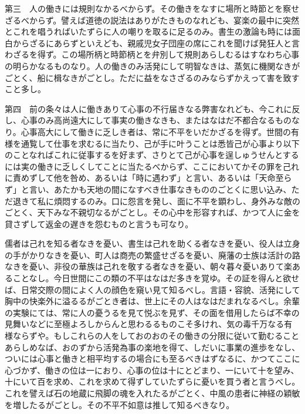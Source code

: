 \documentclass[a4paper, platex, dvipdfmx]{jsarticle}
\begin{document}
第三　人の働きには規則なかるべからず。その働きをなすに場所と時節とを察せざるべからず。譬えば道徳の説法はありがたきものなれども、宴楽の最中に突然とこれを唱うればいたずらに人の嘲りを取るに足るのみ。書生の激論も時には面白からざるにあらずといえども、親戚児女子団座の席にこれを聞けば発狂人と言わざるを得ず。この場所柄と時節柄とを弁別して規則あらしむるはすなわち心事の明らかなるものなり。人の働きのみ活発にして明智なきは、蒸気に機関なきがごとく、船に楫なきがごとし。ただに益をなさざるのみならずかえって害を致すこと多し。

第四　前の条々は人に働きありて心事の不行届きなる弊害なれども、今これに反し、心事のみ高尚遠大にして事実の働きなきも、またはなはだ不都合なるものなり。心事高大にして働きに乏しき者は、常に不平をいだかざるを得ず。世間の有様を通覧して仕事を求むるに当たり、己が手に叶うことは悉皆己が心事より以下のことなればこれに従事するを好まず、さりとて己が心事を逞しゅうせんとするには実の働きに乏しくしてことに当たるべからず、ここにおいてかその罪を己れに責めずして他を咎め、あるいは「時に遇わず」と言い、あるいは「天命至らず」と言い、あたかも天地の間になすべき仕事なきもののごとくに思い込み、ただ退きて私に煩悶するのみ。口に怨言を発し、面に不平を顕わし、身外みな敵のごとく、天下みな不親切なるがごとし。その心中を形容すれば、かつて人に金を貸さずして返金の遅きを怨むものと言うも可なり。

儒者は己れを知る者なきを憂い、書生は己れを助くる者なきを憂い、役人は立身の手がかりなきを憂い、町人は商売の繁盛せざるを憂い、廃藩の士族は活計の路なきを憂い、非役の華族は己れを敬する者なきを憂い、朝々暮々憂いありて楽あることなし。今日世間にこの類の不平はなはだ多きを覚ゆ。その証を得んと欲せば、日常交際の間によく人の顔色を窺い見て知るべし。言語・容貌、活発にして胸中の快楽外に溢るるがごとき者は、世上にその人はなはだまれなるべし。余輩の実験にては、常に人の憂うるを見て悦ぶを見ず、その面を借用したらば不幸の見舞いなどに至極よろしからんと思わるるものこそ多けれ、気の毒千万なる有様ならずや。もしこれらの人をしておのおのその働きの分限に従いて勤むることあらしめなば、おのずから活発為事の楽地を得て、しだいに事業の進歩をなし、ついには心事と働きと相平均するの場合にも至るべきはずなるに、かつてここに心づかず、働きの位は一におり、心事の位は十にとどまり、一にいて十を望み、十にいて百を求め、これを求めて得ずしていたずらに憂いを買う者と言うべし。これを譬えば石の地蔵に飛脚の魂を入れたるがごとく、中風の患者に神経の穎敏を増したるがごとし。その不平不如意は推して知るべきなり。
\end{document}
